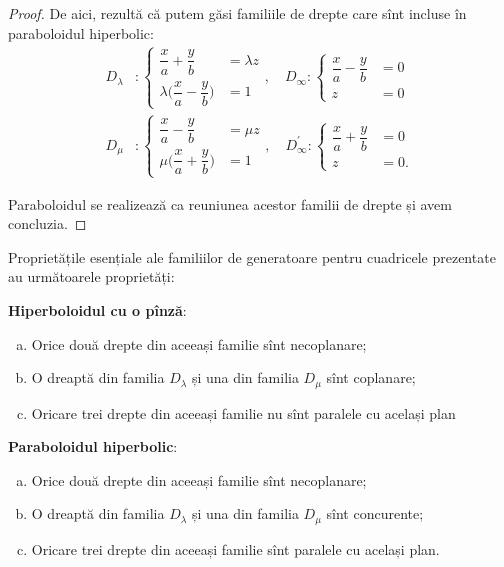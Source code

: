 \begin{proof}
De aici, rezultă că putem găsi familiile de drepte care sînt incluse în
paraboloidul hiperbolic:
\begin{align*}
	D_\lambda &: \begin{cases}	
					\dfrac{x}{a} + \dfrac{y}{b} &= \lambda z \\
					\lambda \Big( \dfrac{x}{a} - \dfrac{y}{b} \Big) &= 1
				\end{cases}, \quad
	D_\infty : \begin{cases}
					\dfrac{x}{a} - \dfrac{y}{b} &= 0 \\
					z &= 0
				\end{cases} \\
	D_\mu &: \begin{cases}	
				\dfrac{x}{a} - \dfrac{y}{b} &= \mu z \\
				\mu \Big( \dfrac{x}{a} + \dfrac{y}{b} \Big) &= 1
			\end{cases}, \quad
	D^{\prime}_\infty : \begin{cases}	
							\dfrac{x}{a} + \dfrac{y}{b} &= 0 \\
							z &= 0.
						\end{cases}
\end{align*}

Paraboloidul se realizează ca reuniunea acestor familii de drepte și avem
concluzia.

\end{proof}

Proprietățile esențiale ale familiilor de generatoare pentru cuadricele 
prezentate au următoarele proprietăți:

\begin{theorem}
	\textbf{Hiperboloidul cu o pînză}:
\begin{enumerate}[(a)]
	\item Orice două drepte din aceeași familie sînt necoplanare;
	\item O dreaptă din familia $D_\lambda$ și una din familia $D_\mu$
sînt coplanare;
	\item Oricare trei drepte din aceeași familie nu sînt paralele
cu același plan
\end{enumerate}

\textbf{Paraboloidul hiperbolic}:
\begin{enumerate}[(a)]
	\item Orice două drepte din aceeași familie sînt necoplanare;
	\item O dreaptă din familia $D_\lambda$ și una din familia $D_\mu$
sînt concurente;
    \item Oricare trei drepte din aceeași familie sînt paralele cu același plan.
\end{enumerate}
\end{theorem}

